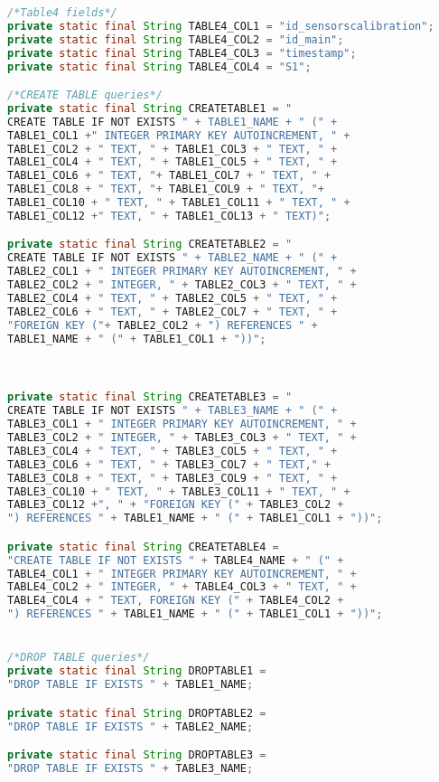 \begin{lstlisting}[language=java, caption={Clase DatabaseHelper, crea la base de datos de no existir y contiene las consultas e inserciones a la misma}, captionpos=b, basicstyle=\small]
/*Table4 fields*/
private static final String TABLE4_COL1 = "id_sensorscalibration";
private static final String TABLE4_COL2 = "id_main";
private static final String TABLE4_COL3 = "timestamp";
private static final String TABLE4_COL4 = "S1";

/*CREATE TABLE queries*/
private static final String CREATETABLE1 = "
CREATE TABLE IF NOT EXISTS " + TABLE1_NAME + " (" + 
TABLE1_COL1 +" INTEGER PRIMARY KEY AUTOINCREMENT, " + 
TABLE1_COL2 + " TEXT, " + TABLE1_COL3 + " TEXT, " + 
TABLE1_COL4 + " TEXT, " + TABLE1_COL5 + " TEXT, " + 
TABLE1_COL6 + " TEXT, "+ TABLE1_COL7 + " TEXT, " + 
TABLE1_COL8 + " TEXT, "+ TABLE1_COL9 + " TEXT, "+ 
TABLE1_COL10 + " TEXT, " + TABLE1_COL11 + " TEXT, " + 
TABLE1_COL12 +" TEXT, " + TABLE1_COL13 + " TEXT)";

private static final String CREATETABLE2 = "
CREATE TABLE IF NOT EXISTS " + TABLE2_NAME + " (" + 
TABLE2_COL1 + " INTEGER PRIMARY KEY AUTOINCREMENT, " + 
TABLE2_COL2 + " INTEGER, " + TABLE2_COL3 + " TEXT, " + 
TABLE2_COL4 + " TEXT, " + TABLE2_COL5 + " TEXT, " + 
TABLE2_COL6 + " TEXT, " + TABLE2_COL7 + " TEXT, " +
"FOREIGN KEY ("+ TABLE2_COL2 + ") REFERENCES " + 
TABLE1_NAME + " (" + TABLE1_COL1 + "))";



private static final String CREATETABLE3 = "
CREATE TABLE IF NOT EXISTS " + TABLE3_NAME + " (" + 
TABLE3_COL1 + " INTEGER PRIMARY KEY AUTOINCREMENT, " + 
TABLE3_COL2 + " INTEGER, " + TABLE3_COL3 + " TEXT, " + 
TABLE3_COL4 + " TEXT, " + TABLE3_COL5 + " TEXT, " + 
TABLE3_COL6 + " TEXT, " + TABLE3_COL7 + " TEXT," + 
TABLE3_COL8 + " TEXT, " + TABLE3_COL9 + " TEXT, " + 
TABLE3_COL10 + " TEXT, " + TABLE3_COL11 + " TEXT, " + 
TABLE3_COL12 +", " + "FOREIGN KEY (" + TABLE3_COL2 + 
") REFERENCES " + TABLE1_NAME + " (" + TABLE1_COL1 + "))";

private static final String CREATETABLE4 = 
"CREATE TABLE IF NOT EXISTS " + TABLE4_NAME + " (" + 
TABLE4_COL1 + " INTEGER PRIMARY KEY AUTOINCREMENT, " + 
TABLE4_COL2 + " INTEGER, " + TABLE4_COL3 + " TEXT, " + 
TABLE4_COL4 + " TEXT, FOREIGN KEY (" + TABLE4_COL2 + 
") REFERENCES " + TABLE1_NAME + " (" + TABLE1_COL1 + "))";


/*DROP TABLE queries*/
private static final String DROPTABLE1 = 
"DROP TABLE IF EXISTS " + TABLE1_NAME;

private static final String DROPTABLE2 = 
"DROP TABLE IF EXISTS " + TABLE2_NAME;

private static final String DROPTABLE3 = 
"DROP TABLE IF EXISTS " + TABLE3_NAME;


\end{lstlisting}
